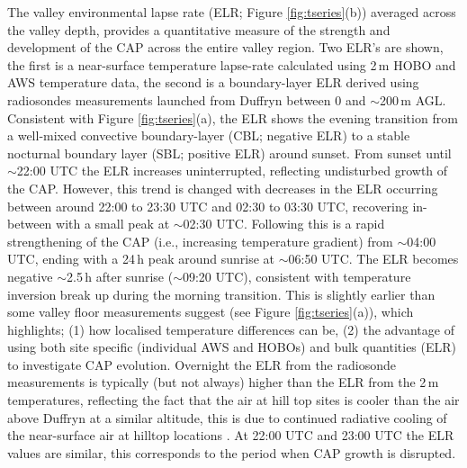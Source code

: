 \documentclass[times]{qjrms4}
\begin{document}
The valley environmental lapse rate (ELR; Figure \ref{fig:tseries}(b)) averaged across the valley depth, provides a quantitative measure of the strength and development of the CAP across the entire valley region. Two ELR's are shown, the first is a near-surface temperature lapse-rate calculated using 2$\,\mbox{m}$ HOBO and AWS temperature data, the second is a boundary-layer ELR derived using radiosondes measurements launched from Duffryn between 0 and $\sim$200$\,\mbox{m}$ AGL. Consistent with Figure \ref{fig:tseries}(a), the ELR shows the evening transition from a well-mixed convective boundary-layer (CBL; negative ELR) to a stable nocturnal boundary layer (SBL; positive ELR) around sunset. From sunset until $\sim$22:00 UTC the ELR increases uninterrupted, reflecting undisturbed growth of the CAP. However, this trend is changed with decreases in the ELR occurring between around 22:00 to 23:30 UTC and 02:30 to 03:30 UTC, recovering in-between with a small peak at $\sim$02:30 UTC. Following this is a rapid strengthening of the CAP (i.e., increasing temperature gradient) from $\sim$04:00 UTC, ending with a 24$\,\mbox{h}$ peak around sunrise at $\sim$06:50 UTC. The ELR becomes negative $\sim$2.5$\,\mbox{h}$ after sunrise ($\sim$09:20 UTC), consistent with temperature inversion break up during the morning transition. This is slightly earlier than some valley floor measurements suggest (see Figure \ref{fig:tseries}(a)), which highlights; (1) how localised temperature differences can be, (2) the advantage of using both site specific (individual AWS and HOBOs) and bulk quantities (ELR) to investigate CAP evolution. Overnight the ELR from the radiosonde measurements is typically (but not always) higher than the ELR from the 2$\,\mbox{m}$ temperatures, reflecting the fact that the air at hill top sites is cooler than the air above Duffryn at a similar altitude, this is due to continued radiative cooling of the near-surface air at hilltop locations \citep{Vosper2013narrow}. At 22:00 UTC and 23:00 UTC the ELR values are similar, this corresponds to the period when CAP growth is disrupted.
\end{document}
